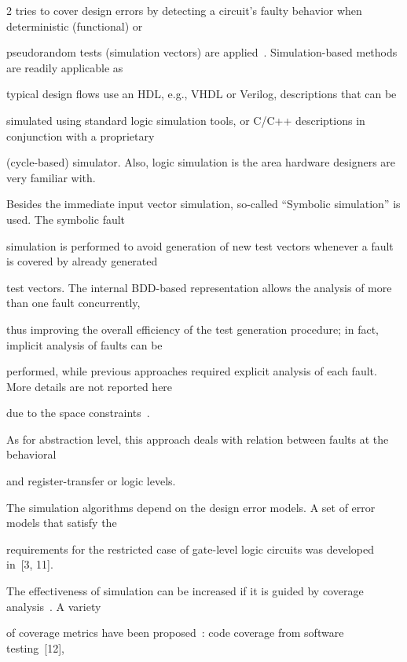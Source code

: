\begin{multicols}{2}
tries to cover design errors by detecting a circuit's faulty behavior when deterministic (functional) or


pseudorandom tests (simulation vectors) are applied~\cite{3bar}. Simulation-based methods are readily applicable as


typical design flows use an HDL, e.g., VHDL or Verilog, descriptions that can be


simulated using standard logic simulation tools, or C/C++ descriptions in conjunction with a proprietary


(cycle-based) simulator. Also, logic simulation is the area hardware designers are very familiar with.





   Besides the immediate input vector simulation, so-called ``Symbolic simulation'' is used. The symbolic fault


simulation is performed to avoid generation of new test vectors whenever a fault is covered by already generated


test vectors. The internal BDD-based representation allows the analysis of more than one fault concurrently,


thus improving the overall efficiency of the test gener\-ation procedure; in fact, implicit analysis of faults can be


performed, while previous approaches required explicit analysis of each fault. More details are not reported here


due to the space constraints~\cite{9bar, 10bar}.





 As for abstraction level, this approach deals with re\-lation between faults at the behavioral


and register-transfer or logic levels.





   The simulation algorithms depend on the design error models. A set of error models that satisfy the


requirements for the restricted case of gate-level logic circuits was developed in~[3, 11].





   The effectiveness of simulation can be increased if it is guided by coverage analysis~\cite{3bar}. A variety


of coverage metrics have been proposed~\cite{6bar}: code coverage from software testing~[12],



\end{multicols}
